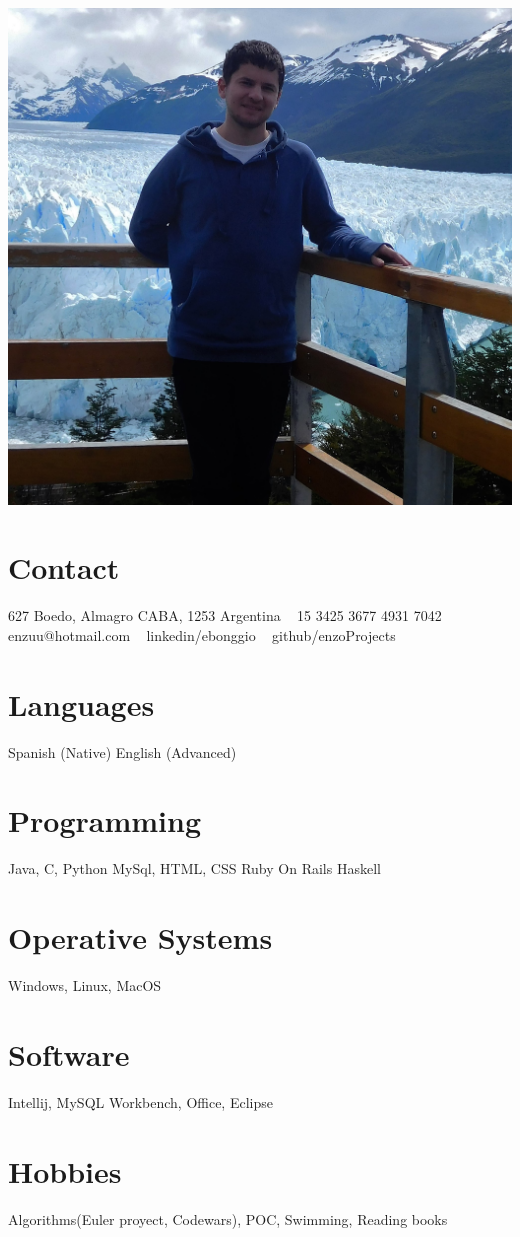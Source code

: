 \documentclass[]{cv-style}
\begin{document}
\lastupdated

\begin{aside}
\includegraphics[scale=0.2]{me}
\section{Contact}
627 Boedo, Almagro
CABA, 1253
Argentina
~
15 3425 3677
4931 7042
~
enzuu@hotmail.com
~
linkedin/ebonggio
~
github/enzoProjects
\section{Languages}
Spanish (Native)
English (Advanced)
\section{Programming}
Java, C, Python
MySql, HTML, CSS
Ruby On Rails
Haskell
\section{Operative Systems}
 Windows, Linux, MacOS
\section{Software}
 Intellij, MySQL Workbench, Office, Eclipse
\section{Hobbies}
 Algorithms(Euler proyect, Codewars), POC, Swimming, Reading books
\end{aside}
\end{document}
